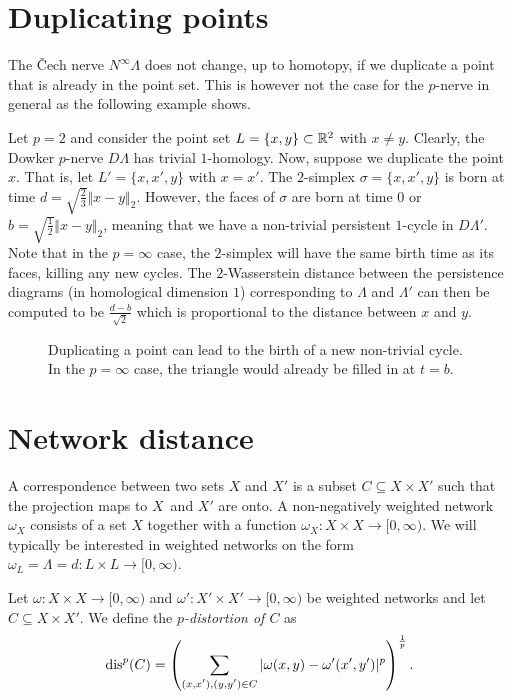 	\section{Duplicating points}
	The Čech nerve $N^\infty\Lambda$ does not change, up to homotopy, if we duplicate a point that is already in the point set. This is however not the case for the $p$-nerve in general as the following example shows.
	
	\begin{ex}
		Let $p=2$ and consider the point set $L=\{x,y\}\subset\mathbb{R}^2$ with $x\neq y$. Clearly, the Dowker $p$-nerve $D\Lambda$ has trivial $1$-homology. Now, suppose we duplicate the point $x$. That is, let $L'=\{x,x',y\}$ with $x=x'$. The $2$-simplex $\sigma=\{x,x',y\}$ is born at time $d=\sqrt{\frac{2}{3}}\Vert x-y\Vert_2$. However, the faces of $\sigma$ are born at time $0$ or $b=\sqrt{\frac{1}{2}}\Vert x-y\Vert_2$, meaning that we have a non-trivial persistent $1$-cycle in $D\Lambda'$. Note that in the $p=\infty$ case, the $2$-simplex will have the same birth time as its faces, killing any new cycles. The $2$-Wasserstein distance between the persistence diagrams (in homological dimension $1$) corresponding to $\Lambda$ and $\Lambda'$ can then be computed to be $\frac{d-b}{\sqrt{2}}$ which is proportional to the distance between $x$ and $y$.
		
		\begin{figure}[h!]
			\centering
			
			\caption{Duplicating a point can lead to the birth of a new non-trivial cycle. In the $p=\infty$ case, the triangle would already be filled in at $t=b$.}
		\end{figure}

		
	\end{ex}
	
	\section{Network distance}
	A correspondence between two sets $X$ and $X'$ is a subset $C\subseteq X\times X'$ such that the projection maps to $X$ and $X'$ are onto. A non-negatively weighted network $\omega_X$ consists of a set $X$ together with a function $\omega_X\colon X\times X\to[0,\infty)$. We will typically be interested in weighted networks on the form $\omega_L=\Lambda=d\colon L\times L\to[0,\infty)$.
	
	\begin{defn}
		Let $\omega\colon X\times X\to[0,\infty)$ and $\omega'\colon X'\times X'\to[0,\infty)$ be weighted networks and let $C\subseteq X\times X'$. We define the \textit{$p$-distortion of $C$} as 
		$$
		\operatorname{dis}^p(C) = \left(\sum_{\substack{(x,x'),(y,y')\in C}}\vert\omega(x,y)-\omega'(x',y')\vert^p\right)^{\frac{1}{p}}.
		$$
	\end{defn}
	
